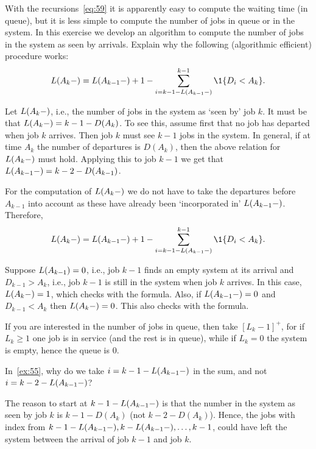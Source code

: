 \begin{exercise}\label{ex:55}
  With the recursions~\cref{eq:59} it is apparently easy to compute the waiting time (in queue), but it is less simple to compute the number of jobs in queue or in the system.
  In this exercise we develop an algorithm to compute the number of jobs in the system as seen by arrivals.  Explain why the following (algorithmic efficient) procedure works:
 \begin{equation*}
 \L(A_k-) = \L(A_{k-1}-)+1 - \sum_{i= k-1 - \L(A_{k-1}-)}^{k-1} \1{D_i< A_k}.
 \end{equation*}
\begin{solution}
 Let $ L(A_{k}-)$, i.e., the number of jobs in the system as
 `seen by' job $k$. It must be that $L(A_{k}-)=k-1 - D(A_{k})$. To see
 this, assume first that no job has departed when job $k$
 arrives. Then job $k$ must see $k-1$ jobs in the system. In general,
 if at time $A_k$ the number of departures is $D(A_k)$, then the
 above relation for $L(A_k-)$ must hold. Applying this to job $k-1$ we get that $L(A_{k-1}-) = k-2 - D(A_{k-1})$.

 For the computation of $L(A_k-)$ we do not have to take the departures
 before $A_{k-1}$ into account as these have already been
 `incorporated in' $L(A_{k-1}-)$. Therefore,
 \begin{equation*}
 \L(A_k-) = \L(A_{k-1}-) + 1 - \sum_{i= k-1 - \L(A_{k-1}-)}^{k-1} \1{D_i< A_k}.
 \end{equation*}

 Suppose $L(A_{k-1})=0$, i.e., job $k-1$ finds an empty system at its
 arrival and $D_{k-1}>A_{k}$, i.e., job $k-1$ is still in the
 system when job $k$ arrives. In this case, $L(A_{k}-)=1$, which checks
 with the formula. Also, if $L(A_{k-1}-)=0$ and $D_{k-1}< A_k$ then
 $L(A_k-) = 0$. This also checks with the formula.

If you are interested in the number of jobs in queue, then take $[L_{k}-1]^{+}$, for if $L_{k}\geq 1$  one job is in service (and the rest is in queue), while if $L_{k}=0$ the system is empty, hence the queue is 0.

\end{solution}
\end{exercise}


\begin{exercise}
 In~\cref{ex:55}, why do we take $i=k-1-L(A_{k-1}-)$ in the sum, and not $i=k-2-L(A_{k-1}-)$?
\begin{solution}
 The reason to start at $k-1-L(A_{k-1}-)$ is that the number in the
 system as seen by job $k$ is $k-1 - D(A_k)$ (not
 $k-2-D(A_k)$). Hence, the jobs with index from
 $k-1-L(A_{k-1}-), k-L(A_{k-1}-), \ldots, k-1$, could have left the system
 between the arrival of job $k-1$ and job $k$.
\end{solution}
\end{exercise}






